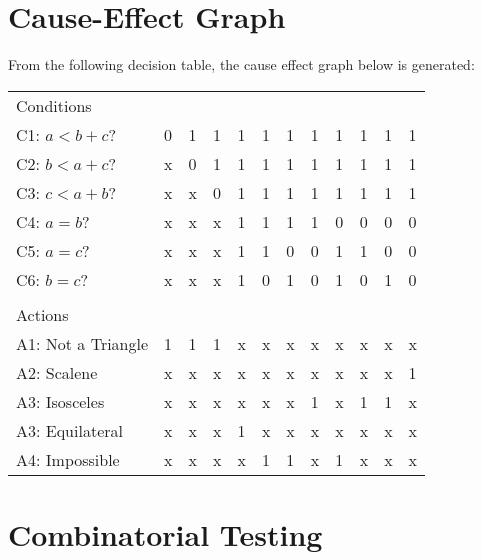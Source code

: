 \documentclass[letterpaper]{article}
\begin{document}
\section{Cause-Effect Graph}
From the following decision table, the cause effect graph below is generated:
\begin{adjustbox}{center}
	\begin{tabular}{llllllllllll}
		Conditions         &   &   &   &   &   &   &   &   &   &   &   \\ \cline{1-1}
		C1: $a<b+c$?       & 0 & 1 & 1 & 1 & 1 & 1 & 1 & 1 & 1 & 1 & 1 \\
		C2: $b<a+c$?       & x & 0 & 1 & 1 & 1 & 1 & 1 & 1 & 1 & 1 & 1 \\
		C3: $c<a+b$?       & x & x & 0 & 1 & 1 & 1 & 1 & 1 & 1 & 1 & 1 \\
		C4: $a=b$?         & x & x & x & 1 & 1 & 1 & 1 & 0 & 0 & 0 & 0 \\
		C5: $a=c$?         & x & x & x & 1 & 1 & 0 & 0 & 1 & 1 & 0 & 0 \\
		C6: $b=c$?         & x & x & x & 1 & 0 & 1 & 0 & 1 & 0 & 1 & 0 \\
		                   &   &   &   &   &   &   &   &   &   &   &   \\
		Actions            &   &   &   &   &   &   &   &   &   &   &   \\ \cline{1-1}
		A1: Not a Triangle & 1 & 1 & 1 & x & x & x & x & x & x & x & x \\
		A2: Scalene        & x & x & x & x & x & x & x & x & x & x & 1 \\
		A3: Isosceles      & x & x & x & x & x & x & 1 & x & 1 & 1 & x \\
		A3: Equilateral    & x & x & x & 1 & x & x & x & x & x & x & x \\
		A4: Impossible     & x & x & x & x & 1 & 1 & x & 1 & x & x & x \\
	\end{tabular}
\end{adjustbox}

\section{Combinatorial Testing}
\end{document}
